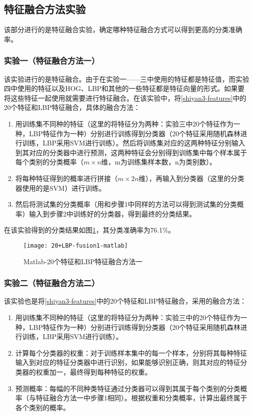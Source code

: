 \subsection{特征融合方法实验}
该部分进行的是特征融合实验，确定哪种特征融合方式可以得到更高的分类准确率。

\subsubsection{实验一（特征融合方法一）}
\label{ronghe1}
该实验进行的是特征融合。由于在实验一——三中使用的特征都是特征值，而实验四中使用的特征以及HOG、LBP和其他的一些特征都是特征向量的形式。如果要将这些特征一起使用就需要进行特征融合。在该实验中，将\ref{shiyan3-features}中的20个特征和LBP特征融合，具体的融合方法：
\begin{enumerate}
\item 用训练集不同种的特征（这里的将特征分为两种：实验三中20个特征作为一种，LBP特征作为一种）分别进行训练得到分类器（20个特征采用随机森林进行训练，LBP采用SVM进行训练）。然后将训练集对应的这两种特征分别输入到其对应的分类器中进行预测，这两种特征会分别得到训练集中每个样本属于每个类别的分类概率（$m \times n$维，m为训练集样本数，n为类别数）。
\item 将每种特征得到的概率进行拼接（$m \times 2n$维），再输入到分类器（这里的分类器使用的是SVM）进行训练。
\item 然后将测试集的分类概率（用和步骤1中同样的方法可以得到测试集的分类概率）输入到步骤2中训练好的分类器，得到最终的分类结果。
\end{enumerate}

在该实验得到的分类结果如图\ref{fig:20+LBP-fusion1-matlab}，其分类准确率为76.1\%。
\begin{figure}[!ht]
\centering
\texttt{[image: 20+LBP-fusion1-matlab]}
\caption{Matlab-20个特征和LBP特征融合方法一}
\label{fig:20+LBP-fusion1-matlab}
\end{figure}

\subsubsection{实验二（特征融合方法二）}
该实验也是将\ref{shiyan3-features}中的20个特征和LBP特征融合，采用的融合方法：
\begin{enumerate}
\item 用训练集不同种的特征（这里的将特征分为两种：实验三中的20个特征作为一种，LBP特征作为一种）分别进行训练得到分类器（20个特征采用随机森林进行训练，LBP采用SVM进行训练）。
\item 计算每个分类器的权重：对于训练样本集中的每一个样本，分别将其每种特征输入到对应的特征分类器中进行识别，如果能够识别正确，则其对应的特征分类器的权重加一，最终得到每种特征的权重。
\item 预测概率：每幅的不同种类特征通过分类器可以得到其属于每个类别的分类概率（与特征融合方法一中步骤1相同）。根据权重和分类概率，计算出最终属于各个类别的概率。
\end{enumerate}

